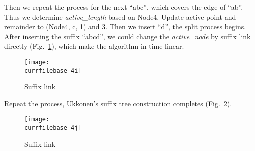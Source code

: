 \documentclass[catalog.tex]{subfiles}
\begin{document}
		Then we repeat the process for the next ``abc'', which covers the edge of ``ab''. Thus we determine {\it active\_length} based on Node4. Update active point and remainder to (Node4, c, 1) and 3. Then we insert ``d'', the split process begins. After inserting the suffix ``abcd'', we could change the {\it active\_node} by suffix link directly (Fig.~\ref{fig:\currfilebase_4i}), which make the algorithm in time linear.


		\begin{figure}[!htb]
			\centering
			\texttt{[image: \\currfilebase\_4i]}
			\caption{Suffix link\cite{UkkonenAnimation}}
			\label{fig:\currfilebase_4i}
		\end{figure}


		Repeat the process, Ukkonen's suffix tree construction completes (Fig.~\ref{fig:\currfilebase_4j}).


		\begin{figure}[!htb]
			\centering
			\texttt{[image: \\currfilebase\_4j]}
			\caption{Suffix link\cite{UkkonenAnimation}}
			\label{fig:\currfilebase_4j}
		\end{figure}
\end{document}
